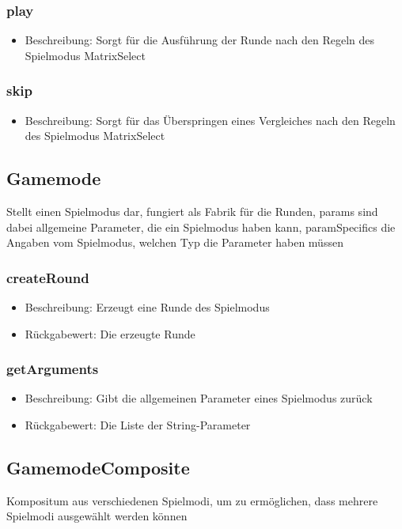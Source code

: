 \documentclass[a4paper]{scrreprt}
\begin{document}
	\subsubsection{play}
	\begin{itemize}
		\item Beschreibung: Sorgt für die Ausführung der Runde nach den Regeln des Spielmodus MatrixSelect
	\end{itemize}
	\subsubsection{skip}
	\begin{itemize}
		\item Beschreibung: Sorgt für das Überspringen eines Vergleiches nach den Regeln des Spielmodus MatrixSelect
	\end{itemize}
	
	\subsection{Gamemode}
	Stellt einen Spielmodus dar, fungiert als Fabrik für die Runden, params sind dabei allgemeine Parameter, die ein Spielmodus haben kann, paramSpecifics die Angaben vom Spielmodus, welchen Typ die Parameter haben müssen
	\subsubsection{createRound}
	\begin{itemize}
		\item Beschreibung: Erzeugt eine Runde des Spielmodus
		\item Rückgabewert: Die erzeugte Runde
	\end{itemize}
	\subsubsection{getArguments}
	\begin{itemize}
		\item Beschreibung: Gibt die allgemeinen Parameter eines Spielmodus zurück
		\item Rückgabewert: Die Liste der String-Parameter %
	\end{itemize}
	
	\subsection{GamemodeComposite}
	Kompositum aus verschiedenen Spielmodi, um zu ermöglichen, dass mehrere Spielmodi ausgewählt werden können
\end{document}
